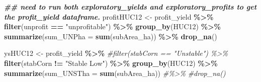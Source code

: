 \documentclass[
]{article}
\newenvironment{Shaded}{\begin{snugshade}}{\end{snugshade}}
\newcommand{\AttributeTok}[1]{\textcolor[rgb]{0.13,0.29,0.53}{#1}}
\newcommand{\CommentTok}[1]{\textcolor[rgb]{0.56,0.35,0.01}{\textit{#1}}}
\newcommand{\DocumentationTok}[1]{\textcolor[rgb]{0.56,0.35,0.01}{\textbf{\textit{#1}}}}
\newcommand{\FunctionTok}[1]{\textcolor[rgb]{0.13,0.29,0.53}{\textbf{#1}}}
\newcommand{\NormalTok}[1]{#1}
\newcommand{\OtherTok}[1]{\textcolor[rgb]{0.56,0.35,0.01}{#1}}
\newcommand{\SpecialCharTok}[1]{\textcolor[rgb]{0.81,0.36,0.00}{\textbf{#1}}}
\newcommand{\StringTok}[1]{\textcolor[rgb]{0.31,0.60,0.02}{#1}}
\begin{document}
\begin{Shaded}
\begin{Highlighting}[]
\DocumentationTok{\#\# need to run both exploratory\_yields and exploratory\_profits to get the profit\_yield dataframe.}
\NormalTok{profitHUC12 }\OtherTok{\textless{}{-}}\NormalTok{ profit\_yield }\SpecialCharTok{\%\textgreater{}\%} 
  \FunctionTok{filter}\NormalTok{(unprofit }\SpecialCharTok{==} \StringTok{"unprofitable"}\NormalTok{) }\SpecialCharTok{\%\textgreater{}\%}
  \FunctionTok{group\_by}\NormalTok{(HUC12) }\SpecialCharTok{\%\textgreater{}\%}
  \FunctionTok{summarize}\NormalTok{(}\AttributeTok{sum\_UNPha =} \FunctionTok{sum}\NormalTok{(subArea\_ha)) }\SpecialCharTok{\%\textgreater{}\%}
  \FunctionTok{drop\_na}\NormalTok{()}

\NormalTok{ysHUC12 }\OtherTok{\textless{}{-}}\NormalTok{ profit\_yield }\SpecialCharTok{\%\textgreater{}\%}
  \CommentTok{\#filter(stabCorn == "Unstable") \%\textgreater{}\%}
  \FunctionTok{filter}\NormalTok{(stabCorn }\SpecialCharTok{!=} \StringTok{"Stable Low"}\NormalTok{) }\SpecialCharTok{\%\textgreater{}\%}
  \FunctionTok{group\_by}\NormalTok{(HUC12) }\SpecialCharTok{\%\textgreater{}\%}
  \FunctionTok{summarize}\NormalTok{(}\AttributeTok{sum\_UNSTha =} \FunctionTok{sum}\NormalTok{(subArea\_ha)) }\CommentTok{\#\%\textgreater{}\%}
  \CommentTok{\#drop\_na()}
\end{Highlighting}
\end{Shaded}
\end{document}
